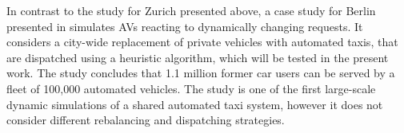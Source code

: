 In contrast to the study for Zurich presented above, a case study for Berlin
presented in \cite{bischoff2016simulation} simulates AVs reacting to dynamically changing requests.
It considers a city-wide replacement of private vehicles with automated taxis, that
are dispatched using a heuristic algorithm, which will be tested in the present work.
 The study concludes that 1.1 million former car users can be served by a fleet
 of 100,000 automated vehicles.
The study is one of the first large-scale dynamic
 simulations of a shared automated taxi system, however it does not consider
 different rebalancing and dispatching strategies.








